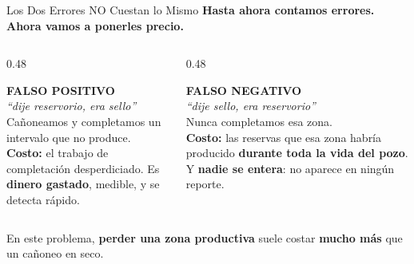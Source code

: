 \documentclass[aspectratio=169, 11pt]{beamer}
\begin{document}
\begin{frame}{Los Dos Errores NO Cuestan lo Mismo}
  \vspace{-6pt}
  {\small\color{arcaDark}\bfseries
    Hasta ahora contamos errores. Ahora vamos a \textbf{ponerles precio}.}

  \vspace{8pt}
  \begin{columns}[T]
    \begin{column}{0.48\textwidth}
      \begin{tcolorbox}[colback=arcaGray, colframe=codeOrange, boxrule=0pt, leftrule=3pt,
        arc=3pt, left=6pt, right=6pt, top=5pt, bottom=5pt]
        {\scriptsize\color{codeOrange}\bfseries FALSO POSITIVO}\\[3pt]
        {\scriptsize\color{arcaDark}\itshape ``dije reservorio, era sello''}\\[5pt]
        {\scriptsize\color{textMuted}
          Cañoneamos y completamos un intervalo que
          no produce.\\[4pt]
          \textbf{Costo:} el trabajo de completación
          desperdiciado. Es \textbf{dinero gastado}, medible,
          y se detecta rápido.}
      \end{tcolorbox}
    \end{column}
    \begin{column}{0.48\textwidth}
      \begin{tcolorbox}[colback=arcaGray, colframe=arcaRed, boxrule=0pt, leftrule=3pt,
        arc=3pt, left=6pt, right=6pt, top=5pt, bottom=5pt]
        {\scriptsize\color{arcaRed}\bfseries FALSO NEGATIVO}\\[3pt]
        {\scriptsize\color{arcaDark}\itshape ``dije sello, era reservorio''}\\[5pt]
        {\scriptsize\color{textMuted}
          Nunca completamos esa zona.\\[4pt]
          \textbf{Costo:} las reservas que esa zona habría
          producido \textbf{durante toda la vida del pozo}.
          Y \textbf{nadie se entera}: no aparece en ningún reporte.}
      \end{tcolorbox}
    \end{column}
  \end{columns}

  \vspace{8pt}
  \centering
  {\footnotesize\color{arcaDark}
    En este problema, \textbf{perder una zona productiva} suele costar
    \textbf{mucho más} que un cañoneo en seco.}
\end{frame}
\end{document}
